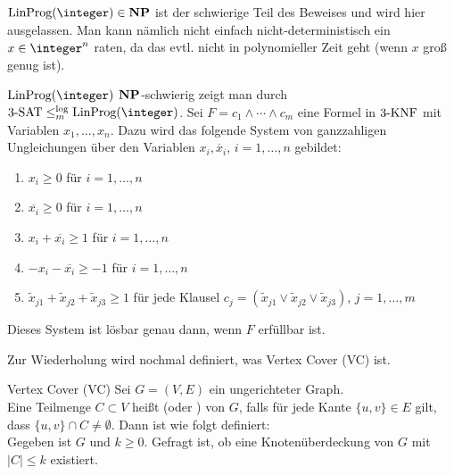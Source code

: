 \begin{Beweis}
    $\LinProg(\integer) \in \NP$ ist der schwierige Teil des Beweises und wird hier ausgelassen.
    Man kann nämlich nicht einfach nicht-deterministisch ein $x \in \integer^n$ raten,
    da das evtl. nicht in polynomieller Zeit geht (wenn $x$ groß genug ist).

    $\LinProg(\integer)$ $\mathbf{NP}$-schwierig zeigt man durch
    $\kSAT{3} \le_m^{\log} \LinProg(\integer)$.
    Sei $F = c_1 \land \dotsb \land c_m$ eine Formel in $3\text{-}\text{KNF}$ mit
    Variablen $x_1, \dotsc, x_n$.
    Dazu wird das folgende System von ganzzahligen Ungleichungen über den Variablen
    $x_i, \overline{x}_i$, $i = 1, \dotsc, n$ gebildet:
    \begin{enumerate}
        \item
        $x_i \ge 0$ für $i = 1, \dotsc, n$

        \item
        $\overline{x_i} \ge 0$ für $i = 1, \dotsc, n$

        \item
        $x_i + \overline{x_i} \ge 1$ für $i = 1, \dotsc, n$

        \item
        $-x_i - \overline{x_i} \ge -1$ für $i = 1, \dotsc, n$

        \item
        $\widetilde{x}_{j1} + \widetilde{x}_{j2} + \widetilde{x}_{j3} \ge 1$
        für jede Klausel
        $c_j = (\widetilde{x}_{j1} \lor \widetilde{x}_{j2} \lor \widetilde{x}_{j3})$,
        $j = 1, \dotsc, m$
    \end{enumerate}
    Dieses System ist lösbar genau dann, wenn $F$ erfüllbar ist.
\end{Beweis}

\linie
\pagebreak

\begin{Bem}
    Zur Wiederholung wird nochmal definiert, was Vertex Cover (VC) ist.
\end{Bem}

\begin{Def}{Vertex Cover (VC)}
    Sei $G = (V, E)$ ein ungerichteter Graph.\\
    Eine Teilmenge $C \subset V$ heißt  (oder ) von $G$,
    falls für jede Kante $\{u, v\} \in E$ gilt, dass $\{u, v\} \cap C \not= \emptyset$.
    Dann ist  wie folgt definiert:\\
    Gegeben ist $G$ und $k \ge 0$.
    Gefragt ist, ob eine Knotenüberdeckung von $G$ mit $|C| \le k$ existiert.
\end{Def}

